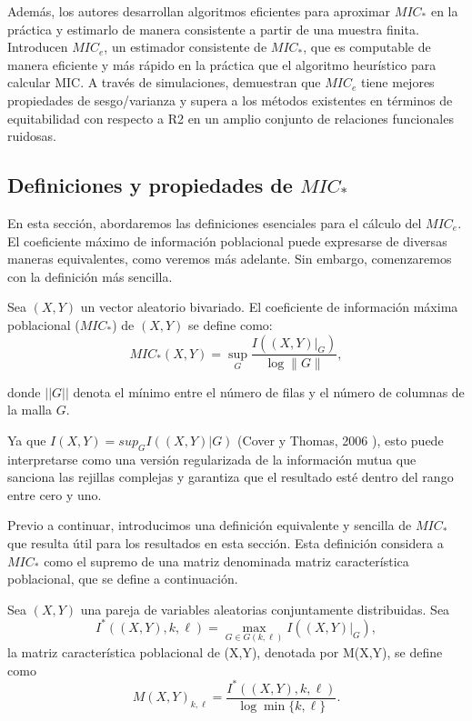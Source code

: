 	Adem\'as, los autores desarrollan algoritmos eficientes para aproximar $MIC_*$ en la pr\'actica y estimarlo de manera consistente a partir de una muestra finita. Introducen $MIC_e$, un estimador consistente de $MIC_*$, que es computable de manera eficiente y m\'as r\'apido en la pr\'actica que el algoritmo heur\'istico para calcular MIC. A trav\'es de simulaciones, demuestran que $MIC_e$ tiene mejores propiedades de sesgo/varianza y supera a los m\'etodos existentes en t\'erminos de equitabilidad con respecto a R2 en un amplio conjunto de relaciones funcionales ruidosas.

	\subsection[short]{Definiciones y propiedades de $MIC_*$}

	En esta secci\'on, abordaremos las definiciones esenciales para el c\'alculo del $MIC_e$. El coeficiente m\'aximo de informaci\'on poblacional puede expresarse de diversas maneras equivalentes, como veremos m\'as adelante. Sin embargo, comenzaremos con la definici\'on m\'as sencilla.

	\begin{defn}
		Sea $(X,Y)$ un vector aleatorio bivariado. El coeficiente de informaci\'on m\'axima poblacional ($MIC_*$) de $(X,Y)$ se define como:
		$$
		M I C_*(X, Y)=\sup _G \frac{I\left(\left.(X, Y)\right|_G\right)}{\log \|G\|},
		$$
		
		donde $||G||$ denota el m\'inimo entre el n\'umero de filas y el n\'umero de columnas de la malla $G$.
	\end{defn}
	
	Ya que $I(X,Y) = sup_G I((X,Y)|G)$ (Cover y Thomas, 2006 \cite[Cap. 8]{CoverThomas2006}), esto puede interpretarse como una versi\'on regularizada de la informaci\'on mutua que sanciona las rejillas complejas y garantiza que el resultado est\'e dentro del rango entre cero y uno.
	
	Previo a continuar, introducimos una definici\'on equivalente y sencilla de $MIC_*$ que resulta \'util para los resultados en esta secci\'on. Esta definici\'on considera a $MIC_*$ como el supremo de una matriz denominada matriz caracter\'istica poblacional, que se define a continuaci\'on.
	
	\begin{defn}
		Sea $(X,Y)$ una pareja de variables aleatorias conjuntamente distribuidas. Sea
		$$
		I^*((X, Y), k, \ell)=\max _{G \in G(k, \ell)} I\left(\left.(X, Y)\right|_G\right),
		$$
		la matriz caracter\'istica poblacional de (X,Y), denotada por M(X,Y), se define como
		$$
		M(X, Y)_{k, \ell}=\frac{I^*((X, Y), k, \ell)}{\log \min \{k, \ell\}}.
		$$
	\end{defn}
	

